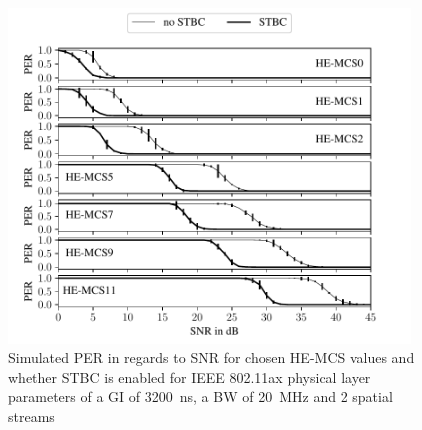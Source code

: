 \begin{figure}%
	\centering
	\includegraphics[width=0.95\textwidth]{figures/STBC_PER_to_SNR.pdf}
	\caption{Simulated \ac{PER} in regards to \ac{SNR} for chosen HE-\ac{MCS} values and whether \ac{STBC} is enabled for IEEE 802.11ax physical layer parameters of a \ac{GI} of \SI{3200}{\nano\second}, a \ac{BW} of \SI{20}{\mega\hertz} and 2 spatial streams}%
	\label{fig:PER_SNR_STBC}%
\end{figure}